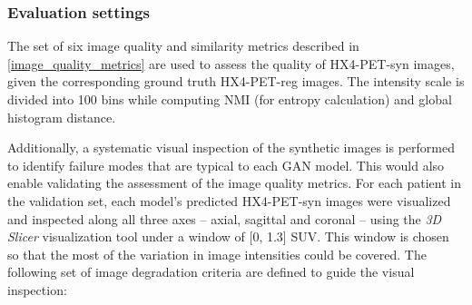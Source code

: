 \subsubsection{Evaluation settings}
The set of six image quality and similarity metrics described in \ref{image_quality_metrics} are used to assess the quality of HX4-PET-syn images, given the corresponding ground truth HX4-PET-reg images. The intensity scale is divided into 100 bins while computing NMI (for entropy calculation) and global histogram distance.

Additionally, a systematic visual inspection of the synthetic images is performed to identify failure modes that are typical to each GAN model. This would also enable validating the assessment of the image quality metrics. For each patient in the validation set, each model's predicted HX4-PET-syn images were visualized and inspected along all three axes -- axial, sagittal and coronal -- using the \textit{3D Slicer} visualization tool under a window of [0, 1.3] SUV. This window is chosen so that the most of the variation in image intensities could be covered. The following set of image degradation criteria are defined to guide the visual inspection:


